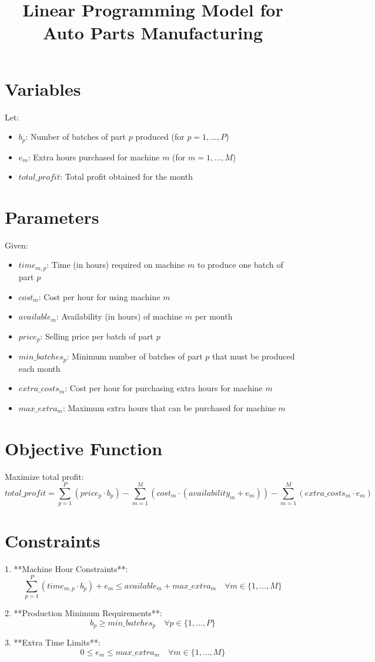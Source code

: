 \documentclass{article}
\begin{document}
\title{Linear Programming Model for Auto Parts Manufacturing}
\author{}
\date{}
\maketitle

\section*{Variables}
Let:
\begin{itemize}
    \item \( b_p \): Number of batches of part \( p \) produced (for \( p = 1, \ldots, P \))
    \item \( e_m \): Extra hours purchased for machine \( m \) (for \( m = 1, \ldots, M \))
    \item \( total\_profit \): Total profit obtained for the month
\end{itemize}

\section*{Parameters}
Given:
\begin{itemize}
    \item \( time_{m,p} \): Time (in hours) required on machine \( m \) to produce one batch of part \( p \)
    \item \( cost_{m} \): Cost per hour for using machine \( m \)
    \item \( available_{m} \): Availability (in hours) of machine \( m \) per month
    \item \( price_{p} \): Selling price per batch of part \( p \)
    \item \( min\_batches_{p} \): Minimum number of batches of part \( p \) that must be produced each month
    \item \( extra\_costs_{m} \): Cost per hour for purchasing extra hours for machine \( m \)
    \item \( max\_extra_{m} \): Maximum extra hours that can be purchased for machine \( m \)
\end{itemize}

\section*{Objective Function}
Maximize total profit:
\[
total\_profit = \sum_{p=1}^{P} (price_{p} \cdot b_p) - \sum_{m=1}^{M} (cost_{m} \cdot (availability_{m} + e_m)) - \sum_{m=1}^{M} (extra\_costs_{m} \cdot e_m)
\]

\section*{Constraints}

1. **Machine Hour Constraints**:
\[
\sum_{p=1}^{P} (time_{m,p} \cdot b_p) + e_m \leq available_{m} + max\_extra_{m} \quad \forall m \in \{1, \ldots, M\}
\]

2. **Production Minimum Requirements**:
\[
b_p \geq min\_batches_{p} \quad \forall p \in \{1, \ldots, P\}
\]

3. **Extra Time Limits**:
\[
0 \leq e_m \leq max\_extra_{m} \quad \forall m \in \{1, \ldots, M\}
\]
\end{document}

